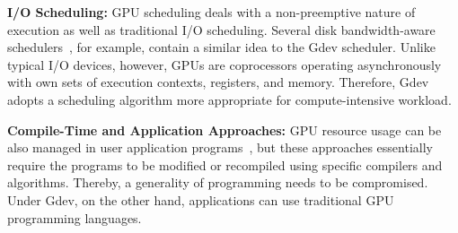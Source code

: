 \textbf{I/O Scheduling:}
GPU scheduling deals with a non-preemptive nature of execution as well
as traditional I/O scheduling.
Several disk bandwidth-aware schedulers~\cite{Gulati_FAST09,
Povzner_EUROSYS08, Wang_FAST07}, for example, contain a similar idea to
the Gdev scheduler.
Unlike typical I/O devices, however, GPUs are coprocessors operating
asynchronously with own sets of execution contexts, registers, and memory.
Therefore, Gdev adopts a scheduling algorithm more appropriate for
compute-intensive workload.

\textbf{Compile-Time and Application Approaches:}
GPU resource usage can be also managed in user application
programs~\cite{Chen_IPDPS10,Guevara09,Saba_RTSS11}, but these approaches
essentially require the programs to be modified or recompiled using
specific compilers and algorithms.
Thereby, a generality of programming needs to be compromised.
Under Gdev, on the other hand, applications can use traditional GPU
programming languages.

